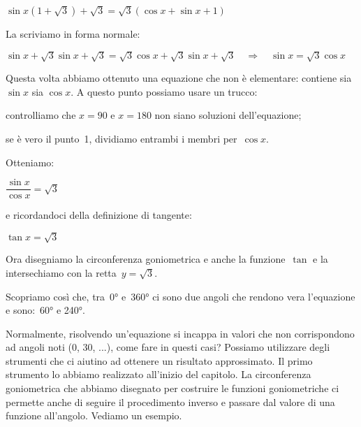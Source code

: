  \begin{esempio}
  \(\sin x (1 + \sqrt{3}) + \sqrt{3} = \sqrt{3}(\cos x + \sin x +1)\)

La scriviamo in forma normale:

\(\sin x + \sqrt{3} \sin x + \sqrt{3} = 
  \sqrt{3} \cos x + \sqrt{3} \sin x + \sqrt{3} \quad \Rightarrow \quad 
\sin x  = \sqrt{3} \cos x \)

Questa volta abbiamo ottenuto una equazione che non è elementare: 
contiene sia \(\sin x\) sia \(\cos x\).
A questo punto possiamo usare un trucco:
  
 \begin{minipage}{.50\textwidth}
  \begin{center}
\begin{inaccessibleblock}[Soluzione grafica dell'equazione: 
    \(\tan x = \sqrt{3}\).]
    
\end{inaccessibleblock}
  \end{center}
 \end{minipage}
 \begin{minipage}{.48\textwidth}
  \begin{enumerate*}
   \item controlliamo che \(x = 90\) e \(x = 180\) non siano soluzioni 
    dell'equazione;
   \item se è vero il punto~1, dividiamo entrambi i membri per~\(\cos x\).
  \end{enumerate*}
  Otteniamo:

  \(\dfrac{\sin x}{\cos x} = \sqrt{3}\)
  
  e ricordandoci della definizione di tangente:

  \(\tan x = \sqrt{3}\)
  
  Ora disegniamo la circonferenza goniometrica e anche la funzione~\(\tan\) 
  e la intersechiamo con la retta~\(y=\sqrt{3}\).
  
  Scopriamo così che, tra~0° e~360° ci sono due angoli che rendono vera 
  l'equazione e sono:~60° e 240°. 
 \end{minipage}
 \end{esempio}


 Normalmente, risolvendo un'equazione si incappa in valori che non 
 corrispondono ad angoli noti (0\grado, 30\grado, ...), come fare in questi 
 casi? Possiamo utilizzare degli strumenti che ci aiutino ad ottenere un 
 risultato approssimato. Il primo strumento lo abbiamo realizzato all'inizio 
 del capitolo. La circonferenza goniometrica che abbiamo disegnato per 
 costruire le funzioni goniometriche ci permette anche di seguire il 
 procedimento inverso e passare dal valore di una funzione all'angolo. 
 Vediamo un esempio.
 
